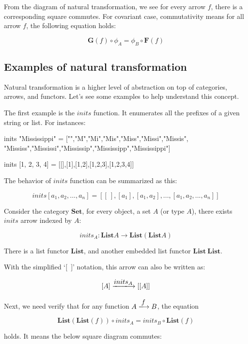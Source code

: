 \documentclass[b5paper]{article}
\begin{document}
From the diagram of natural transformation, we see for every arrow $f$, there is a corresponding square commutes. For covariant case, commutativity means for all arrow $f$, the following equation holds:

\[
\mathbf{G}(f) \circ \phi_A= \phi_B \circ \mathbf{F}(f)
\]

\subsection{Examples of natural transformation}

Natural transformation is a higher level of abstraction on top of categories, arrows, and functors. Let's see some examples to help understand this concept.

\begin{example}
\normalfont
The first example is the $inits$ function. It enumerates all the prefixes of a given string or list. For instances:

\begin{Haskell}[frame=none]
inits "Mississippi" = ["","M","Mi","Mis","Miss","Missi","Missis",
        "Mississ","Mississi","Mississip","Mississipp","Mississippi"]

inits [1, 2, 3, 4] = [[],[1],[1,2],[1,2,3],[1,2,3,4]]
\end{Haskell}

The behavior of $inits$ function can be summarized as this:

\[
inits [a_1, a_2, ..., a_n] = [[\ ], [a_1], [a_1, a_2], ..., [a_1, a_2, ..., a_n]]
\]

Consider the category $\pmb{Set}$, for every object, a set $A$ (or type $A$), there exists $inits$ arrow indexed by $A$:

\[
inits_A : \mathbf{List} A \to \mathbf{List}(\mathbf{List} A)
\]

There is a list functor $\mathbf{List}$, and another embedded list functor $\mathbf{List}\ \mathbf{List}$.

With the simplified `[\ ]' notation, this arrow can also be written as:

\[
[A] \arrowto{inits_A} [[A]]
\]

Next, we need verify that for any function $A \arrowto{f} B$, the equation

\[
\mathbf{List}(\mathbf{List}(f)) \circ inits_A = inits_B \circ \mathbf{List}(f)
\]

holds. It means the below square diagram commutes:


\end{example}
\end{document}
